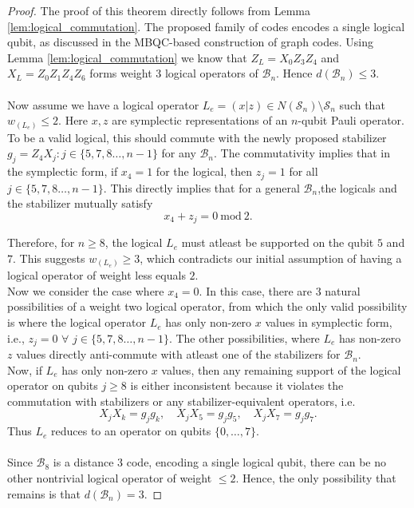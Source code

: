 \documentclass[reprint, amsmath,amssymb, aps,pra,
 floatfix,
]{revtex4-2}
\begin{document}
\begin{proof}
The proof of this theorem directly follows from Lemma \ref{lem:logical_commutation}.
The proposed family of codes encodes a single logical qubit, as discussed in the MBQC-based construction of graph codes. 
Using Lemma \ref{lem:logical_commutation} we know that $Z_L = X_0Z_3Z_4$ and $X_L = Z_0Z_1Z_4Z_6$ forms weight $3$ logical operators of $\mathcal{B}_n$.
Hence $d(\mathcal{B}_n)\le 3$.\\\\
Now assume we have a logical operator $L_e=(x|z)\in N(\mathcal{S}_n)\setminus \mathcal{S}_n$ such that ${w}_{(L_e)}\le 2$.
Here $x,z$ are symplectic representations of an $n$-qubit Pauli operator.
To be a valid logical, this should commute with the newly proposed stabilizer $g_j = Z_4X_j: j\in\{5,7,8 \dots,n-1\}$ for any $\mathcal{B}_n$.
The commutativity implies that in the symplectic form, if $x_4=1$ for the logical, then $z_j=1$ for all $j\in\{5,7,8\dots,n-1\}$.
This directly implies that for a general $\mathcal{B}_n$,the logicals and the stabilizer mutually satisfy
\[
x_4 + z_j = 0 \ \text{mod}  \ 2.
\]

\noindent Therefore, for $n \geq 8$, the logical $L_e$ must atleast be supported on the qubit $5$ and $7$.
This suggests $w_{(L_e)}\ge 3$, which contradicts our initial assumption of having a logical operator of weight less equals $2$.\\
\noindent Now we consider the case where $x_4 = 0$.
In this case, there are $3$ natural possibilities of a weight two logical operator, from which the only valid possibility is where the logical operator $L_e$ has only non-zero $x$ values in symplectic form, i.e., $z_j = 0 \,\,\forall\,\, j\in\{5,7,8\dots,n-1\}$.
The other possibilities, where $L_e$ has non-zero $z$ values directly anti-commute with atleast one of the stabilizers for $\mathcal{B}_n$.\\
Now, if $L_e$ has only non-zero $x$ values, then any remaining support of the logical operator on qubits $j\ge 8$ is either inconsistent because it violates the commutation with stabilizers or any stabilizer-equivalent operators, i.e.
\[
X_j X_k = g_j g_k, \quad X_j X_5 = g_j g_5, \quad X_j X_7 = g_j g_7.
\]
Thus $L_e$ reduces to an operator on qubits $\{0,\dots,7\}$.\\\\
\noindent Since $\mathcal{B}_8$ is a distance $3$ code, encoding a single logical qubit, there can be no other nontrivial logical operator of weight $\le 2$.
Hence, the only possibility that remains is that $d(\mathcal{B}_n)=3$.
\end{proof}
\end{document}
